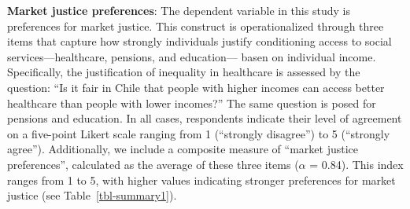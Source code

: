 \documentclass[
  12pt,
]{article}
\begin{document}
\textbf{Market justice preferences}: The dependent variable in this
study is preferences for market justice. This construct is
operationalized through three items that capture how strongly
individuals justify conditioning access to social services---healthcare,
pensions, and education--- basen on individual income. Specifically, the
justification of inequality in healthcare is assessed by the question:
``Is it fair in Chile that people with higher incomes can access better
healthcare than people with lower incomes?'' The same question is posed
for pensions and education. In all cases, respondents indicate their
level of agreement on a five-point Likert scale ranging from 1
(``strongly disagree'') to 5 (``strongly agree''). Additionally, we
include a composite measure of ``market justice preferences'',
calculated as the average of these three items (\(\alpha\) = 0.84). This
index ranges from 1 to 5, with higher values indicating stronger
preferences for market justice (see Table~\ref{tbl-summary1}).
\end{document}
